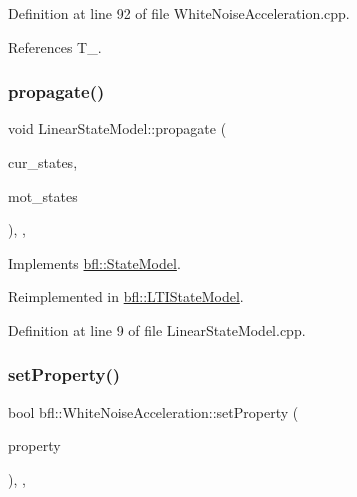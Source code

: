 Definition at line 92 of file White\+Noise\+Acceleration.\+cpp.



References T\+\_\+.

\mbox{\label{classbfl_1_1LinearStateModel_a7823383ddc1ed709b9399c712997f512}} 
\subsubsection{\texorpdfstring{propagate()}{propagate()}}
{\footnotesize\ttfamily void Linear\+State\+Model\+::propagate (\begin{DoxyParamCaption}\item[{const Eigen\+::\+Ref$<$ const Eigen\+::\+Matrix\+Xd $>$ \&}]{cur\+\_\+states,  }\item[{Eigen\+::\+Ref$<$ Eigen\+::\+Matrix\+Xd $>$}]{mot\+\_\+states }\end{DoxyParamCaption})\hspace{0.3cm}{\ttfamily [override]}, {\ttfamily [virtual]}, {\ttfamily [inherited]}}



Implements \mbox{\hyperlink{classbfl_1_1StateModel_a39cd8c8c5adbd623884583b4a7a7415c}{bfl\+::\+State\+Model}}.



Reimplemented in \mbox{\hyperlink{classbfl_1_1LTIStateModel_a0a736ef66903c2e598f0b86892a716aa}{bfl\+::\+L\+T\+I\+State\+Model}}.



Definition at line 9 of file Linear\+State\+Model.\+cpp.

\mbox{\label{classbfl_1_1WhiteNoiseAcceleration_a0203b47074e0680852f53dcba8a7a627}} 
\subsubsection{\texorpdfstring{set\+Property()}{setProperty()}}
{\footnotesize\ttfamily bool bfl\+::\+White\+Noise\+Acceleration\+::set\+Property (\begin{DoxyParamCaption}\item[{const std\+::string \&}]{property }\end{DoxyParamCaption})\hspace{0.3cm}{\ttfamily [inline]}, {\ttfamily [override]}, {\ttfamily [virtual]}}



